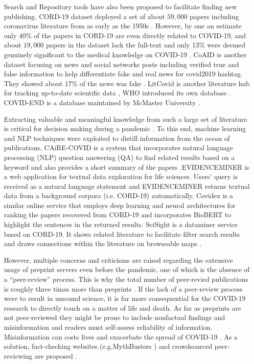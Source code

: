 \documentclass[acmsmall,authordraft]{acmart}
\begin{document}
Search and Repository tools have also been proposed to facilitate finding new publishing. CORD-19 dataset deployed a set of about $59,000$ papers including coronavirus literature from as early as the 1950s \citep{Brainard2020drowning}.  However, by one an estimate only $40$\% of the papers in CORD-19 are even directly related to COVID-19, and about $19,000$ papers in the dataset lack the full-text \citep{Brainard2020drowning} and only 13\% were deemed genuinely significant to the medical knowledge on COVID-19 \citep{coveymercy}. CoAID \citep{cui2020coaid} is another dataset focusing on news and social networks posts including verified true and false information to help differentiate fake and real news for covid2019 hashtag. They showed about $17$\% of the news was fake \citep{cui2020coaid}. LitCovid is another literature hub for tracking up-to-date scientific data \citep{chen2020keep}, WHO introduced its own database \citep{WHO2020Data}. COVID-END is a database maintained by McMaster University \citep{www.mcmasterhealthforum.org}.

Extracting valuable and meaningful knowledge from such a large set of literature is critical for decision making during a pandemic \citep{hechenbleikner2020data}. To this end, machine learning and NLP techniques were exploited to distill information from the ocean of publications. CAiRE-COVID \citep{su2020caire} is a system that incorporates natural language processing (NLP) question answering (QA) to find related results based on a keyword and also provides a short summary of the papers \citep{su2020caire}.EVIDENCEMINER \citep{wang2020automatic} is a web application for textual data exploration for life sciences. Users' query is received as a natural language statement and  EVIDENCEMINER returns textual data from a background corpora (i.e. CORD-19) automatically. Covidex \citep{zhang2020rapidly} is a similar online service that employs deep learning and neural architectures for ranking the papers recovered from CORD-19 and incorporates BioBERT to highlight the sentences in the returned results. SciSight is a dataminer service based on CORD-19. It shows related literature to facilitate filter search results and draws connections within the literature on browseable maps \citep{Brainard2020drowning}.
 
However, multiple concerns and criticisms are raised regarding the extensive usage of preprint servers even before the pandemic, one of which is the absence of a ``peer-review'' process. This is why the total number of peer-revied publications is roughly three times more than preprints \citep{horbach2020pandemic}. If the lack of a peer-review process were to result in unsound science, it is far more consequential for the COVID-19 research to directly touch on a matter of life and death. As far as preprints are not peer-reviewed they might be prone to include nonfactual findings and misinformation and readers must self-assess reliability of information. Misinformation can costs lives and exacerbate the spread of COVID-19 \citep{garrett2020covid, NPR2020dies}. As a solution, fact-checking websites (e.g.MythBusters \citep{WHOmyth}) and crowdsourced peer-reviewing are proposed \citep{roitero2020covid}.
\end{document}
